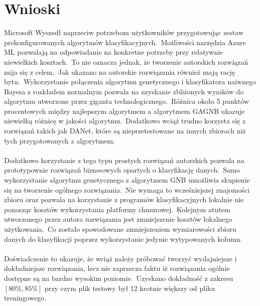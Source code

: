 \section{Wnioski}

Microsoft Wyszedł naprzeciw potrzebom użytkowników przygotowując zestaw prekonfigurowanych algorytmów klasyfikacyjnych.\ Możliwości narzędzia Azure ML pozwalają na odpowiadanie na konkretne potrzeby przy relatywnie niewielkich kosztach.\ To nie oznacza jednak, że tworzenie autorskich rozwiązań mija się z celem.\ Jak ukazano na  autorskie rozwiązania również mają rację bytu.\ Wykorzystanie połączenia algorytmu genetycznego i klasyfikatora naiwnego Bayesa z rozkładem normalnym pozwala na uzyskanie zbliżonych wyników do algorytmu utworzone przez giganta technologicznego.\ Różnica około 5 punktów procentowych między najlepszym algorytmem a algorytmem GAGNB ukazuje niewielką różnicę w jakości algorytmu.\ Dodatkowo wciąż trudno korzysta się z rozwiązań takich jak DANet, które są nieprzetestowane na innych zbiorach niż tych przygotowanych z algorytmem.
\\ \\
Dodatkowo korzystanie z tego typu prostych rozwiązań autorskich pozwala na prototypownie rozwiązań biznesowych opartych o klasyfikację danych.\ Samo wykorzystanie algorytmu genetycznego z algorytmem GNB umożliwia skupienie się na tworzenie ogólnego rozwiązania.\ Nie wymaga to wcześniejszej znajomości zbioru oraz pozwala na korzystanie z programów klasyfikacyjnych lokalnie nie ponosząc kosztów wykorzystania platformy chmurowej.\ Kolejnym atutem utworzonego przez autora rozwiązania jest zmniejszenie kosztów lokalnego użytkowania.\ Co zostało spowodowane zmniejszeniem wymiarowości zbioru danych do klasyfikacji poprzez wykorzystanie jedynie wytypowanych kolumn.
\\ \\
Doświadczenie to ukazuje, że wciąż należy próbować tworzyć wydajniejsze i dokładniejsze rozwiązania, lecz nie zaprzecza faktu iż rozwiązania ogólnie dostępne są na bardzo wysokim poziomie.\ Uzyskano dokładność z zakresu $[80\%, 85\%]$ przy czym plik testowy był 12 krotnie większy od pliku treningowego.

